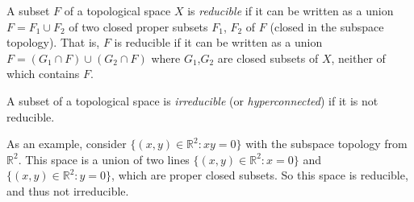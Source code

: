 \documentclass[12pt]{article}
\begin{document}
A subset $F$ of a topological space $X$ is {\em reducible} if it can be written as a union $F = F_1 \cup F_2$ of two closed proper subsets $F_1$, $F_2$ of $F$ (closed in the subspace topology).  That is, $F$ is reducible if it can be written as a union $F = (G_1\cap F)\cup(G_2\cap F)$ where $G_1$,$G_2$ are closed subsets of $X$, neither of which contains $F$.

A subset of a topological space is {\em irreducible} (or \emph{hyperconnected}) if it is not reducible.

As an example, consider $\{ (x,y)\in\mathbb{R}^2 : xy = 0 \}$ with the subspace topology from $\mathbb{R}^2$.  This space is a union of two lines $\{ (x,y)\in\mathbb{R}^2 : x = 0 \}$ and $\{ (x,y)\in\mathbb{R}^2 : y = 0 \}$, which are proper closed subsets.  So this space is reducible, and thus not irreducible.
\end{document}
